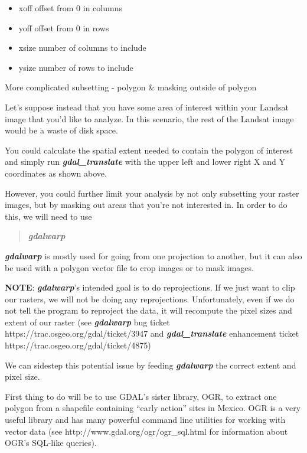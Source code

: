 \documentclass{article}
\begin{document}
\begin{itemize}
\itemsep1pt\parskip0pt
\item
  xoff offset from 0 in columns
\item
  yoff offset from 0 in rows
\item
  xsize number of columns to include
\item
  ysize number of rows to include
\end{itemize}

    More complicated subsetting - polygon \& masking outside of polygon

Let's suppose instead that you have some area of interest within your
Landsat image that you'd like to analyze. In this scenario, the rest of
the Landsat image would be a waste of disk space.

You could calculate the spatial extent needed to contain the polygon of
interest and simply run \textbf{\emph{gdal\_translate}} with the upper
left and lower right X and Y coordinates as shown above.

However, you could further limit your analysis by not only subsetting
your raster images, but by masking out areas that you're not interested
in. In order to do this, we will need to use

\begin{quote}
\textbf{\emph{gdalwarp}}
\end{quote}

\textbf{\emph{gdalwarp}} is mostly used for going from one projection to
another, but it can also be used with a polygon vector file to crop
images or to mask images.

\textbf{NOTE}: \textbf{\emph{gdalwarp}}'s intended goal is to do
reprojections. If we just want to clip our rasters, we will not be doing
any reprojections. Unfortunately, even if we do not tell the program to
reproject the data, it will recompute the pixel sizes and extent of our
raster (see \textbf{\emph{gdalwarp}} bug ticket
https://trac.osgeo.org/gdal/ticket/3947 and
\textbf{\emph{gdal\_translate}} enhancement ticket
https://trac.osgeo.org/gdal/ticket/4875)

We can sidestep this potential issue by feeding \textbf{\emph{gdalwarp}}
the correct extent and pixel size.

First thing to do will be to use GDAL's sister library, OGR, to extract
one polygon from a shapefile containing ``early action'' sites in
Mexico. OGR is a very useful library and has many powerful command line
utilities for working with vector data (see
http://www.gdal.org/ogr/ogr\_sql.html for information about OGR's
SQL-like queries).
\end{document}
